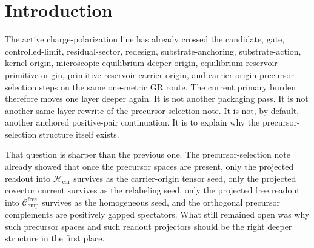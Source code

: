 \documentclass[11pt]{article}
\newcommand{\CompFree}{\mathscr C_{\mathrm{cmp}}^{\mathrm{free}}}
\newcommand{\CarrierClass}{\mathscr H_{\mathrm{car}}}
\begin{document}
\begin{abstract}
In this normal form, the deeper functional is unitarily identical to the precursor-selection functional of the previous note. Constrained elimination therefore reproduces exactly the same carrier-origin functional, and the previously recorded downstream eliminations then reproduce exactly the same primitive reservoir, the same microscopic-equilibrium completion reservoir, the same \(\Pi_{\mathrm{free}}H=0\) outcome, the same substrate and observer completion solves, and the same one operative metric.

The scope remains disciplined. This note does not claim a final ultraviolet completion of the branch or a uniqueness theorem for every conceivable deeper microphysical sector. Its exact positive claim is narrower: at the current quadratic exact-preservation scope, the precursor-selection structure is not an extra same-layer postulate but the forced image-plus-kernel normal form of any still-deeper selection sector that preserves the recorded carrier-origin functional and hence the recorded one-metric completion chain.
\end{abstract}

\section{Introduction}

The active charge-polarization line has already crossed the candidate, gate, controlled-limit, residual-sector, redesign, substrate-anchoring, substrate-action, kernel-origin, microscopic-equilibrium deeper-origin, equilibrium-reservoir primitive-origin, primitive-reservoir carrier-origin, and carrier-origin precursor-selection steps on the same one-metric GR route. The current primary burden therefore moves one layer deeper again. It is not another packaging pass. It is not another same-layer rewrite of the precursor-selection note. It is not, by default, another anchored positive-pair continuation. It is to explain why the precursor-selection structure itself exists.

That question is sharper than the previous one. The precursor-selection note already showed that once the precursor spaces are present, only the projected readout into \(\CarrierClass\) survives as the carrier-origin tensor seed, only the projected covector current survives as the relabeling seed, only the projected free readout into \(\CompFree\) survives as the homogeneous seed, and the orthogonal precursor complements are positively gapped spectators. What still remained open was why such precursor spaces and such readout projectors should be the right deeper structure in the first place.
\end{document}
